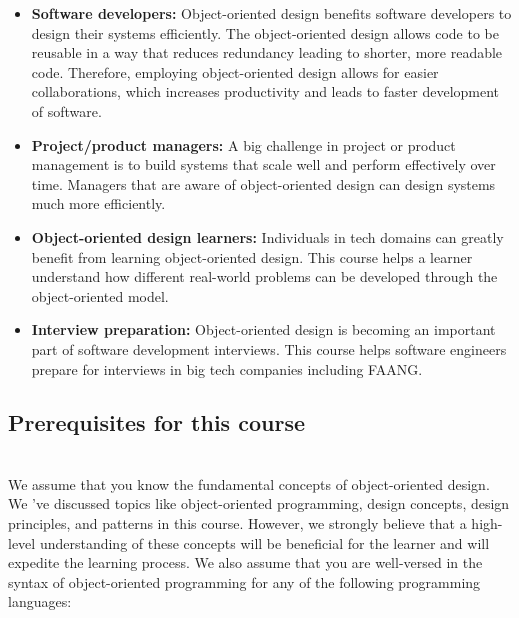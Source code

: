 \begin{itemize}
\item
\protect{}\label{DfRHIGDDxYfegWvUCDsa5}
\textbf{Software developers:} Object-oriented design benefits software developers to design their systems efficiently. The object-oriented design allows code to be reusable in a way that reduces redundancy leading to shorter, more readable code. Therefore, employing object-oriented design allows for easier collaborations, which increases productivity and leads to faster development of software.
\item
\protect{}\label{6RbpHqilrghCWIRzIsTRj}
\textbf{Project/product managers:} A big challenge in project or product management is to build systems that scale well and perform effectively over time. Managers that are aware of object-oriented design can design systems much more efficiently.
\item
\protect{}\label{I4STlKBqWQHKLNDYOsy9x}
\textbf{Object-oriented design learners:} Individuals in tech domains can greatly benefit from learning object-oriented design. This course helps a learner understand how different real-world problems can be developed through the object-oriented model.
\item
\protect{}\label{PwaKlh_OpmImD5zzhAEMF}
\textbf{Interview preparation:} Object-oriented design is becoming an important part of software development interviews. This course helps software engineers prepare for interviews in big tech companies including FAANG.
\end{itemize}

\subsection{\texorpdfstring{Prerequisites for this course \href{https://docs.google.com/document/d/1nrPnEuUUusqrWggFODq_5HZ1cQS5ie7MiY94L5wAaQQ/edit?usp=sharing}{}}{Prerequisites for this course }}\label{GbTCpQVHH5szzZGL_ao0C}
\\
We assume that you know the fundamental concepts of object-oriented design. We 've discussed topics like object-oriented programming, design concepts, design principles, and patterns in this course. However, we strongly believe that a high-level understanding of these concepts will be beneficial for the learner and will expedite the learning process. We also assume that you are well-versed in the syntax of object-oriented programming for any of the following programming languages:

